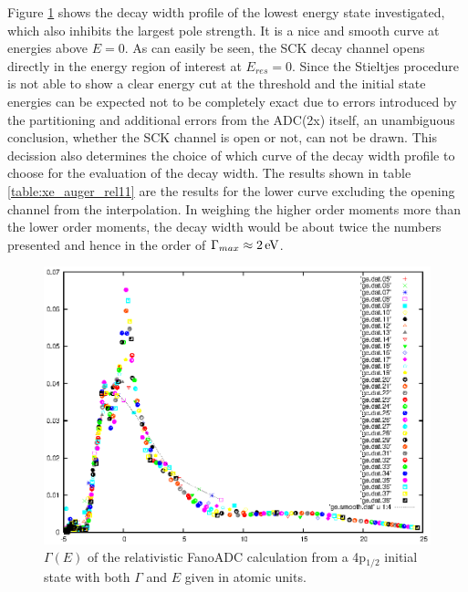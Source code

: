 Figure \ref{figure:Xe4p11_Gamma_profile} shows the decay width profile
of the lowest energy state investigated, which also inhibits the largest
pole strength. It is a nice and smooth curve at energies above $E=0$.
As can easily be seen, the \ac{SCK} decay channel opens directly
in the energy region of interest at $E_{res}=0$. Since the Stieltjes procedure
is not able to show a clear energy cut at the threshold and the initial state
energies can be expected not to be completely exact due to errors introduced
by the partitioning and additional errors from the ADC(2x) itself, an
unambiguous conclusion, whether the \ac{SCK} channel is open or not, can not be drawn.
This decission also determines the choice of which curve of the decay width
profile to choose for the evaluation of the decay width. The results shown
in table \ref{table:xe_auger_rel11} are the results for the lower curve excluding
the opening channel from the interpolation. In weighing the higher order moments
more than the lower order moments, the decay width would be about twice the numbers
presented and hence in the order of $\Gamma_{max} \approx \unit[2]{eV}$.

\begin{figure}[]
  \centering
  \includegraphics[scale=1.0]{pics/Xe4p_11_gammae.eps}
  \caption{$\Gamma(E)$ of the relativistic FanoADC calculation from a 4p$_{1/2}$
           initial state with both $\Gamma$ and $E$ given in atomic units.
           }
  \label{figure:Xe4p11_Gamma_profile}
\end{figure}


